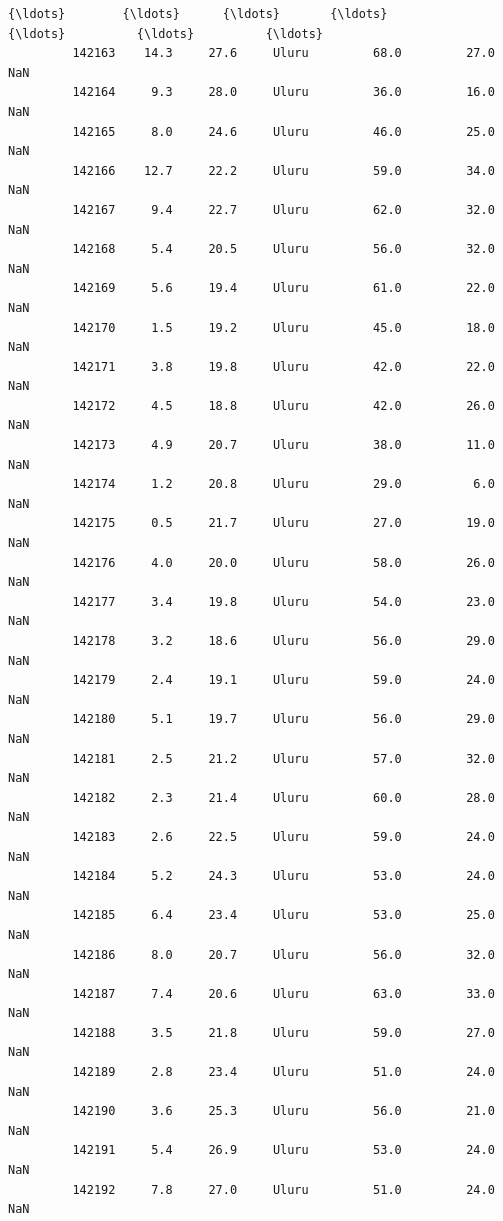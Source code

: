 \documentclass[11pt]{article}
\begin{document}
\begin{Verbatim}[commandchars=\\\{\}]
         {\ldots}        {\ldots}      {\ldots}       {\ldots}          {\ldots}          {\ldots}          {\ldots}   
         142163    14.3     27.6     Uluru         68.0         27.0          NaN   
         142164     9.3     28.0     Uluru         36.0         16.0          NaN   
         142165     8.0     24.6     Uluru         46.0         25.0          NaN   
         142166    12.7     22.2     Uluru         59.0         34.0          NaN   
         142167     9.4     22.7     Uluru         62.0         32.0          NaN   
         142168     5.4     20.5     Uluru         56.0         32.0          NaN   
         142169     5.6     19.4     Uluru         61.0         22.0          NaN   
         142170     1.5     19.2     Uluru         45.0         18.0          NaN   
         142171     3.8     19.8     Uluru         42.0         22.0          NaN   
         142172     4.5     18.8     Uluru         42.0         26.0          NaN   
         142173     4.9     20.7     Uluru         38.0         11.0          NaN   
         142174     1.2     20.8     Uluru         29.0          6.0          NaN   
         142175     0.5     21.7     Uluru         27.0         19.0          NaN   
         142176     4.0     20.0     Uluru         58.0         26.0          NaN   
         142177     3.4     19.8     Uluru         54.0         23.0          NaN   
         142178     3.2     18.6     Uluru         56.0         29.0          NaN   
         142179     2.4     19.1     Uluru         59.0         24.0          NaN   
         142180     5.1     19.7     Uluru         56.0         29.0          NaN   
         142181     2.5     21.2     Uluru         57.0         32.0          NaN   
         142182     2.3     21.4     Uluru         60.0         28.0          NaN   
         142183     2.6     22.5     Uluru         59.0         24.0          NaN   
         142184     5.2     24.3     Uluru         53.0         24.0          NaN   
         142185     6.4     23.4     Uluru         53.0         25.0          NaN   
         142186     8.0     20.7     Uluru         56.0         32.0          NaN   
         142187     7.4     20.6     Uluru         63.0         33.0          NaN   
         142188     3.5     21.8     Uluru         59.0         27.0          NaN   
         142189     2.8     23.4     Uluru         51.0         24.0          NaN   
         142190     3.6     25.3     Uluru         56.0         21.0          NaN   
         142191     5.4     26.9     Uluru         53.0         24.0          NaN   
         142192     7.8     27.0     Uluru         51.0         24.0          NaN   
         

\end{Verbatim}
\end{document}
